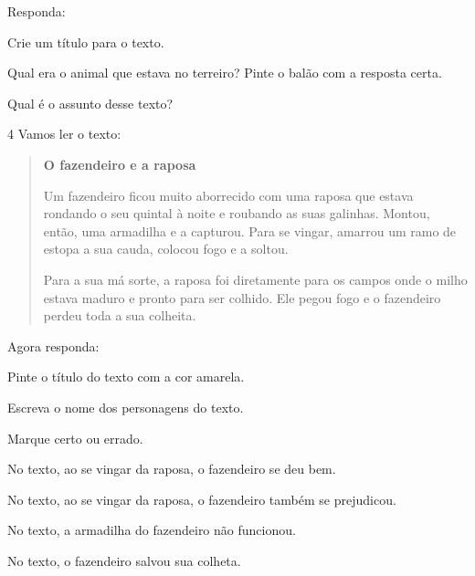 Responda:

\begin{escolha}
\item Crie um título para o texto.


\item Qual era o animal que estava no terreiro? Pinte o balão com a resposta certa.

\item Qual é o assunto desse texto?

\end{escolha}

\num{4} Vamos ler o texto:


\begin{quote}
\textbf{O fazendeiro e a raposa}

Um fazendeiro ficou muito aborrecido com uma raposa que estava rondando o
seu quintal à noite e roubando as suas galinhas. Montou, então, uma
armadilha e a capturou. Para se vingar, amarrou um ramo de estopa
a sua cauda, colocou fogo e a soltou.

Para a sua má sorte, a raposa foi diretamente para os campos onde o milho
estava maduro e pronto para ser colhido. Ele pegou fogo e o fazendeiro perdeu toda a sua colheita.

\end{quote}

Agora responda:

\begin{escolha}
\item Pinte o título do texto com a cor amarela.

\item Escreva o nome dos personagens do texto.


\item Marque certo ou errado.

\begin{boxlist}
 No texto, ao se vingar da raposa, o fazendeiro se deu bem.

 No texto, ao se vingar da raposa, o fazendeiro também se prejudicou.

 No texto, a armadilha do fazendeiro não funcionou.

 No texto, o fazendeiro salvou sua colheta.
\end{boxlist}
\end{escolha}

